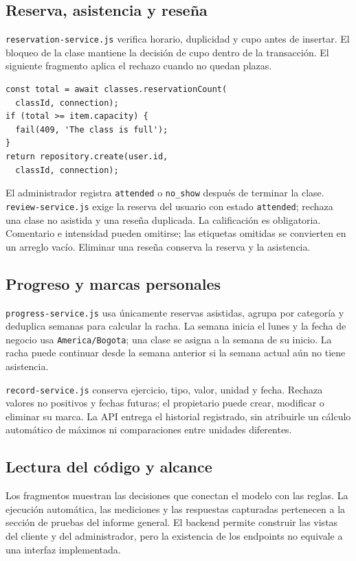 \subsection{Reserva, asistencia y reseña}
\texttt{reservation-service.js} verifica horario, duplicidad y cupo antes de insertar. El bloqueo de la clase mantiene la decisión de cupo dentro de la transacción. El siguiente fragmento aplica el rechazo cuando no quedan plazas.
\begin{lstlisting}[caption={Control de cupo en la transacción de reserva.}]
const total = await classes.reservationCount(
  classId, connection);
if (total >= item.capacity) {
  fail(409, 'The class is full');
}
return repository.create(user.id,
  classId, connection);
\end{lstlisting}
El administrador registra \texttt{attended} o \texttt{no\_show} después de terminar la clase. \texttt{review-service.js} exige la reserva del usuario con estado \texttt{attended}; rechaza una clase no asistida y una reseña duplicada. La calificación es obligatoria. Comentario e intensidad pueden omitirse; las etiquetas omitidas se convierten en un arreglo vacío. Eliminar una reseña conserva la reserva y la asistencia.

\subsection{Progreso y marcas personales}
\texttt{progress-service.js} usa únicamente reservas asistidas, agrupa por categoría y deduplica semanas para calcular la racha. La semana inicia el lunes y la fecha de negocio usa \texttt{America/Bogota}; una clase se asigna a la semana de su inicio. La racha puede continuar desde la semana anterior si la semana actual aún no tiene asistencia.

\texttt{record-service.js} conserva ejercicio, tipo, valor, unidad y fecha. Rechaza valores no positivos y fechas futuras; el propietario puede crear, modificar o eliminar su marca. La API entrega el historial registrado, sin atribuirle un cálculo automático de máximos ni comparaciones entre unidades diferentes.

\subsection{Lectura del código y alcance}
Los fragmentos muestran las decisiones que conectan el modelo con las reglas. La ejecución automática, las mediciones y las respuestas capturadas pertenecen a la sección de pruebas del informe general. El backend permite construir las vistas del cliente y del administrador, pero la existencia de los endpoints no equivale a una interfaz implementada.
